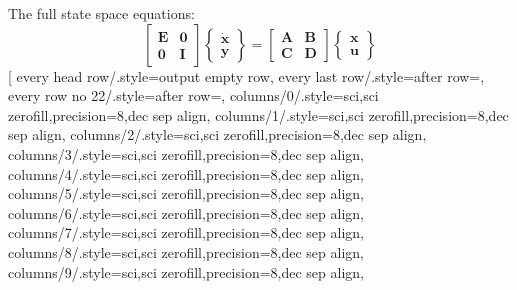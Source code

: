 \begin{footnotesize}
\begin{center}
\end{center}
\end{footnotesize}
\noindent The full state space equations:
\[
\begin{bmatrix}
{\mathbf E} & {\bm 0} \\ {\bm 0} & {\mathbf I}
\end{bmatrix}
\begin{Bmatrix}
\dot{\bm x}\\ {\bm y}
\end{Bmatrix}
=\begin{bmatrix}
\mathbf{A} & \mathbf{B} \\ \mathbf{C} & \mathbf{D}
\end{bmatrix}
\begin{Bmatrix}
{\bm x}\\ {\bm u}\end{Bmatrix}
\]
\pgfplotstabletypeset[
every head row/.style={output empty row},
every last row/.style={after row={}},
every row no 22/.style={after row=\midrule},
columns/0/.style={sci,sci zerofill,precision=8,dec sep align},
columns/1/.style={sci,sci zerofill,precision=8,dec sep align},
columns/2/.style={sci,sci zerofill,precision=8,dec sep align},
columns/3/.style={sci,sci zerofill,precision=8,dec sep align},
columns/4/.style={sci,sci zerofill,precision=8,dec sep align},
columns/5/.style={sci,sci zerofill,precision=8,dec sep align},
columns/6/.style={sci,sci zerofill,precision=8,dec sep align},
columns/7/.style={sci,sci zerofill,precision=8,dec sep align},
columns/8/.style={sci,sci zerofill,precision=8,dec sep align},
columns/9/.style={sci,sci zerofill,precision=8,dec sep align},
